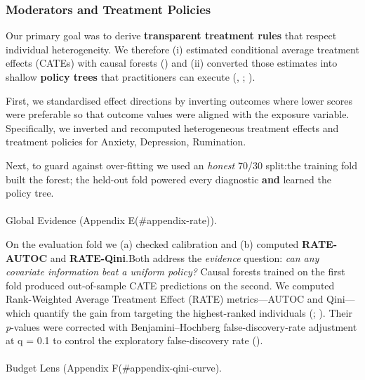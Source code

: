 \documentclass[
  single column]{article}
\makeatletter
\let\oldparagraph\paragraph
\renewcommand{\paragraph}{
    \@ifstar
      \xxxParagraphStar
      \xxxParagraphNoStar
  }
\newcommand{\xxxParagraphStar}[1]{\oldparagraph*{#1}\mbox{}}
\newcommand{\xxxParagraphNoStar}[1]{\oldparagraph{#1}\mbox{}}
\makeatother
\begin{document}
\subsubsection{Moderators and Treatment
Policies}\label{moderators-and-treatment-policies}

Our primary goal was to derive \textbf{transparent treatment rules} that
respect individual heterogeneity. We therefore (i) estimated conditional
average treatment effects (CATEs) with causal forests
() and (ii) converted
those estimates into shallow \textbf{policy trees} that practitioners
can execute (,
;
).

First, we standardised effect directions by inverting outcomes where
lower scores were preferable so that outcome values were aligned with
the exposure variable. Specifically, we inverted and recomputed
heterogeneous treatment effects and treatment policies for Anxiety,
Depression, Rumination.

Next, to guard against over-fitting we used an \emph{honest} 70/30
split:the training fold built the forest; the held-out fold powered
every diagnostic \textbf{and} learned the policy tree.

\paragraph{Global Evidence (Appendix
E(\#appendix-rate)).}\label{global-evidence-appendix-eappendix-rate.}

On the evaluation fold we (a) checked calibration and (b) computed
\textbf{RATE-AUTOC} and \textbf{RATE-Qini}.Both address the
\emph{evidence} question: \emph{can any covariate information beat a
uniform policy?} Causal forests trained on the first fold produced
out-of-sample CATE predictions on the second. We computed Rank-Weighted
Average Treatment Effect (RATE) metrics---AUTOC and Qini---which
quantify the gain from targeting the highest-ranked individuals
(;
). Their \emph{p}-values
were corrected with Benjamini--Hochberg false-discovery-rate adjustment
at q = 0.1 to control the exploratory false-discovery rate
().

\paragraph{Budget Lens (Appendix
F(\#appendix-qini-curve).}\label{budget-lens-appendix-fappendix-qini-curve.}
\end{document}

